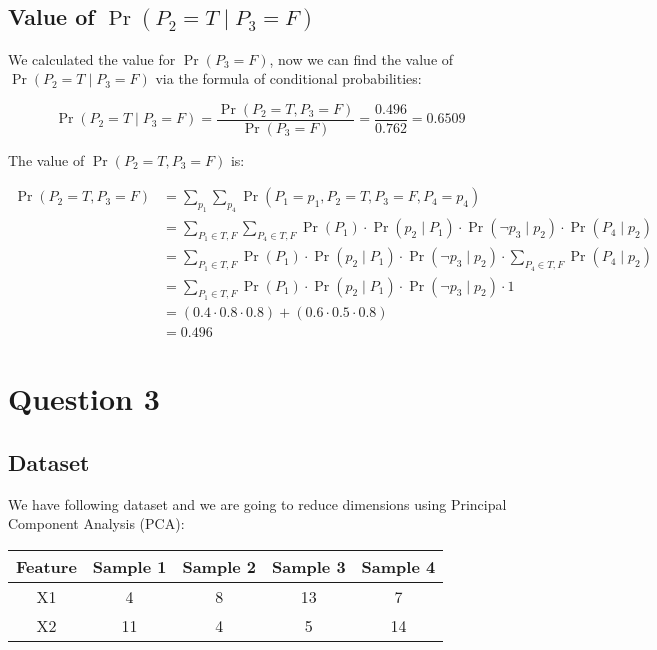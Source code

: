 \documentclass{article}
\begin{document}
\pagebreak

\subsection{Value of $\Pr(P_2 = T \mid P_3 = F)$}

We calculated the value for $\Pr(P_3 = F)$, now we can find the value of $\Pr(P_2 = T \mid P_3 = F)$ via the formula of conditional probabilities:

\[
    \Pr(P_2 = T \mid P_3 = F) = \frac{\Pr(P_2 = T, P_3 = F)}{\Pr(P_3 = F)} = \frac{0.496}{0.762} = 0.6509
\]

\bigskip
\hrulefill
\bigskip

The value of $\Pr(P_2 = T, P_3 = F)$ is:

\[
    \begin{aligned}
        \Pr(P_2 = T, P_3 = F) &= \sum_{p_1} \sum_{p_4} \Pr(P_1 = p_1, P_2 = T, P_3 = F, P_4 = p_4) \\
        &= \sum_{P_1 \in T,F} \sum_{P_4 \in T,F} \Pr(P_1) \cdot \Pr(p_2 \mid P_1) \cdot \Pr(\neg p_3 \mid p_2) \cdot \Pr(P_4 \mid p_2) \\
        &= \sum_{P_1 \in T,F} \Pr(P_1) \cdot \Pr(p_2 \mid P_1) \cdot \Pr(\neg p_3 \mid p_2) \cdot \sum_{P_4 \in T,F} \Pr(P_4 \mid p_2) \\
        &= \sum_{P_1 \in T,F} \Pr(P_1) \cdot \Pr(p_2 \mid P_1) \cdot \Pr(\neg p_3 \mid p_2) \cdot 1 \\
        &= (0.4 \cdot 0.8 \cdot 0.8) + (0.6 \cdot 0.5 \cdot 0.8) \\
        &= 0.496
    \end{aligned}
\]

\pagebreak

\section{Question 3}

\subsection{Dataset}
We have following dataset and we are going to reduce dimensions using Principal Component Analysis (PCA):

\bigskip

\begin{tabular}{|c|c|c|c|c|}
  \hline
    \textbf{Feature} & \textbf{Sample 1} & \textbf{Sample 2} & \textbf{Sample 3} & \textbf{Sample 4} \\
  \hline
    X1 & 4 & 8 & 13 & 7\\
  \hline
    X2 & 11 & 4 & 5 & 14 \\
  \hline
\end{tabular}
\end{document}
